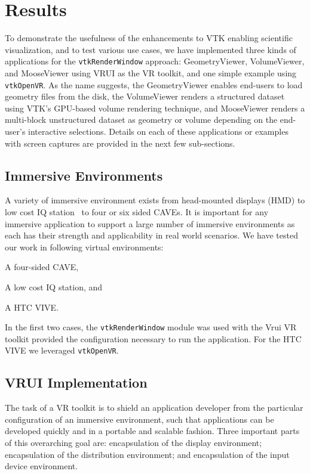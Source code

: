 \section{Results}

To demonstrate the usefulness of the enhancements to VTK enabling scientific visualization, and to test various use cases, we have implemented three kinds of applications for the \texttt{vtkRenderWindow} approach: GeometryViewer, VolumeViewer, and MooseViewer using VRUI as the VR toolkit, and one simple example using \texttt{vtkOpenVR}. As the name suggests, the GeometryViewer enables end-users to load geometry files from the disk, the VolumeViewer renders a structured dataset using VTK's GPU-based volume rendering technique, and MooseViewer renders a multi-block unstructured dataset as geometry or volume depending on the end-user's interactive selections. Details on each of these applications or examples with screen captures are provided in the next few sub-sections. 

\subsection{Immersive Environments}

A variety of immersive environment exists from head-mounted displays (HMD) to low cost IQ station~\cite{Sherman:2010} to four or six sided CAVEs. It is important for any immersive application to support a large number of immersive environments as each has their strength and applicability in real world scenarios. We have tested our work in following virtual environments: 

\begin{compactitem}
\item A four-sided CAVE,
\item A low cost IQ station, and 
\item A HTC VIVE.
\end{compactitem}

In the first two cases, the \texttt{vtkRenderWindow} module was used with the Vrui VR toolkit provided the configuration necessary to run the application. For the HTC VIVE we leveraged \texttt{vtkOpenVR}. 

\subsection{VRUI Implementation}

The task of a VR toolkit is to shield an application developer from the particular configuration of an immersive environment, such that applications can be developed quickly and in a portable and scalable fashion. Three important parts of this overarching goal are: encapsulation of the display environment; encapsulation of the distribution environment; and encapsulation of the input device environment.


